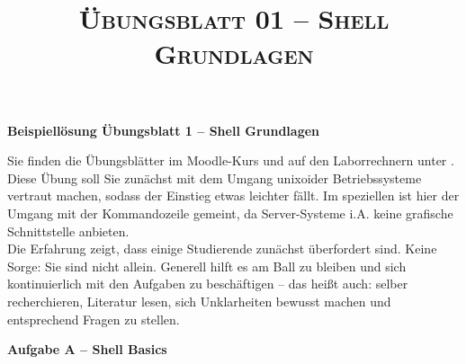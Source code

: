 \documentclass[paper=a4,fontsize=11pt]{scrartcl}%
\title{	
\normalfont \normalsize 
\textsc{Übungsblatt 01 -- Shell Grundlagen}
}
\numberwithin{equation}{section}
\begin{document}
\begin{center}
\Large{\textbf{Beispiellösung Übungsblatt 1 -- Shell Grundlagen}}
\end{center}
Sie finden die Übungsblätter im Moodle-Kurs und auf den Laborrechnern unter .\\
\linebreak[4]
Diese Übung soll Sie zunächst mit dem Umgang unixoider Betriebssysteme vertraut machen, sodass der Einstieg etwas leichter fällt. Im speziellen ist hier der Umgang mit der Kommandozeile gemeint, da Server-Systeme i.A. keine grafische Schnittstelle anbieten.\\
Die Erfahrung zeigt, dass einige Studierende zunächst überfordert sind. Keine Sorge: Sie sind nicht allein. Generell hilft es am Ball zu bleiben und sich kontinuierlich mit den Aufgaben zu beschäftigen -- das heißt auch: selber recherchieren, Literatur lesen, sich Unklarheiten bewusst machen und entsprechend Fragen zu stellen.
\begin{center}\Large{\textbf{Aufgabe A -- Shell Basics}}\end{center}\vskip0.25in
\end{document}
